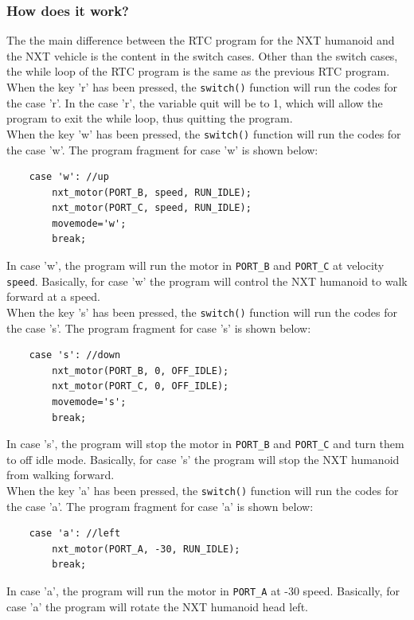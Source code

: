 \documentclass[12pt]{article}
\begin{document}
\subsubsection*{How does it work?}
The the main difference between the RTC program for the NXT humanoid and the NXT vehicle is the content
    in the switch cases.
Other than the switch cases, the while loop of the RTC program is the same as the previous RTC program.
When the key 'r' has been pressed, the \verb+switch()+ function will run the codes for the case 'r'.
In the case 'r', the variable quit will be to 1, which will allow the program to exit the while loop,
    thus quitting the program.
\\
When the key 'w' has been pressed, the \verb+switch()+ function will run the codes for the case 'w'.
The program fragment for case 'w' is shown below:
\begin{verbatim} 
    case 'w': //up
        nxt_motor(PORT_B, speed, RUN_IDLE);
        nxt_motor(PORT_C, speed, RUN_IDLE);
        movemode='w';
        break;
\end{verbatim}
In case 'w', the program will run the motor in \verb+PORT_B+ and \verb+PORT_C+ at velocity \verb+speed+.
Basically, for case 'w' the program will control the NXT humanoid to walk forward at a speed.
\\
When the key 's' has been pressed, the \verb+switch()+ function will run the codes for the case 's'.
The program fragment for case 's' is shown below:
\begin{verbatim} 
    case 's': //down
        nxt_motor(PORT_B, 0, OFF_IDLE);
        nxt_motor(PORT_C, 0, OFF_IDLE);
        movemode='s';
        break;
\end{verbatim}
In case 's', the program will stop the motor in \verb+PORT_B+ and \verb+PORT_C+ and turn them to off idle mode.
Basically, for case 's' the program will stop the NXT humanoid from walking forward.
\\
When the key 'a' has been pressed, the \verb+switch()+ function will run the codes for the case 'a'.
The program fragment for case 'a' is shown below:
\begin{verbatim} 
    case 'a': //left
        nxt_motor(PORT_A, -30, RUN_IDLE);
        break;
\end{verbatim}
In case 'a', the program will run the motor in \verb+PORT_A+ at -30 speed.
Basically, for case 'a' the program will rotate the NXT humanoid head left.
\\
\end{document}
